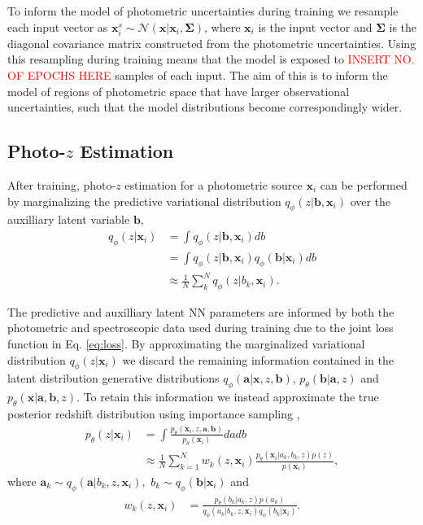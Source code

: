 To inform the model of photometric uncertainties during training we resample each input vector as $\mathbf{x}_i^s \sim \mathcal{N}(\mathbf{x}|\mathbf{x}_i, \boldsymbol{\Sigma})$, where $\mathbf{x}_i$ is the input vector and $\boldsymbol{\Sigma}$ is the diagonal covariance matrix constructed from the photometric uncertainties. Using this resampling during training means that the model is exposed to \textcolor{red}{INSERT NO. OF EPOCHS HERE} samples of each input. The aim of this is to inform the model of regions of photometric space that have larger observational uncertainties, such that the model distributions become correspondingly wider.

\subsection{Photo-$z$ Estimation}

After training, photo-$z$ estimation for a photometric source $\mathbf{x}_i$ can be performed by marginalizing the predictive variational distribution $q_\phi(z|\mathbf{b},\mathbf{x}_i)$ over the auxilliary latent variable $\mathbf{b}$,
\begin{align}
    q_\phi(z|\mathbf{x}_i) &= \int q_\phi(z|\mathbf{b}, \mathbf{x}_i) db \\
    &= \int q_\phi(z|\mathbf{b},\mathbf{x}_i) q_\phi(\mathbf{b}|\mathbf{x}_i) db \\
    &\approx \frac{1}{N} \sum_k^N q_\phi(z|b_k,\mathbf{x}_i). \label{eq:predictive_variational_dist}
\end{align}

The predictive and auxilliary latent NN parameters are informed by both the photometric and spectroscopic data used during training due to the joint loss function in Eq. \ref{eq:loss}. By approximating the marginalized variational distribution $q_\phi(z|\mathbf{x}_i)$ we discard the remaining information contained in the latent distribution generative distributions $q_\phi(\mathbf{a}|\mathbf{x},z,\mathbf{b})$, $p_\theta(\mathbf{b}|\mathbf{a},z)$ and $p_\theta(\mathbf{x}|\mathbf{a},\mathbf{b},z)$. To retain this information we instead approximate the true posterior redshift distribution using importance sampling \citep{bishopPatternRecognitionMachine2006},
\begin{align}
    p_\theta(z|\mathbf{x}_i) &= \int \frac{p_\theta(\mathbf{x}_i, z, \mathbf{a}, \mathbf{b})}{p_\theta(\mathbf{x}_i)}dadb \\
    &\approx \frac{1}{N} \sum_{k=1}^N w_k(z, \mathbf{x}_i)\frac{p_\theta(\mathbf{x}_i|a_k, b_k, z) p(z)}{p(\mathbf{x}_i)}, \label{eq:redshift_posterior}
\end{align}
where $\mathbf{a}_k \sim q_\phi(\mathbf{a}|b_k, z, \mathbf{x}_i),$ $ b_k \sim q_\phi(\mathbf{b}|\mathbf{x}_i)$ and
\begin{align}
    w_k(z, \mathbf{x}_i) &= \frac{
        p_\theta(b_k| a_k, z) p(a_k) 
    }{
        q_\phi(a_k|b_k, z, \mathbf{x}_i) q_\phi(b_k|\mathbf{x}_i)
    }.
\end{align}

